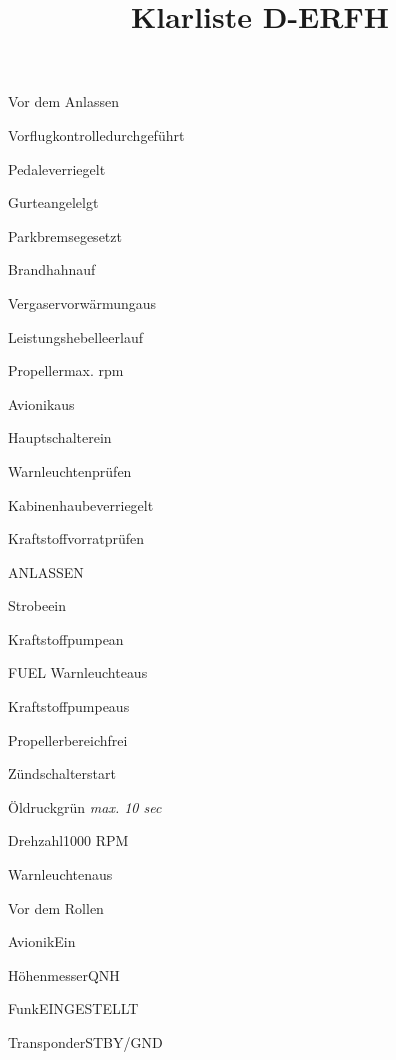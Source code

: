 \def\papersize{4}





\title{Klarliste D-ERFH}

\begin{task}
  \begin{checklist}{Vor dem Anlassen}
    \item{Vorflugkontrolle}{durchgeführt}
    \item{Pedale}{verriegelt}
    \item{Gurte}{angelelgt}
    \item{Parkbremse}{gesetzt}
    \item{Brandhahn}{auf}
    \item{Vergaservorwärmung}{aus}
    \item{Leistungshebel}{leerlauf}
    \item{Propeller}{max. rpm}
    \item{Avionik}{aus}
    \item{Hauptschalter}{ein}
    \item{Warnleuchten}{prüfen}
    \item{Kabinenhaube}{verriegelt}
    \item{Kraftstoffvorrat}{prüfen}
  \end{checklist}
\end{task}

\begin{task}
  \begin{checklist}{ANLASSEN}
    \item{Strobe}{ein}
    \item{Kraftstoffpumpe}{an}
    \item{FUEL Warnleuchte}{aus}
    \item{Kraftstoffpumpe}{aus}
    \item{Propellerbereich}{frei}
    \item{Zündschalter}{start}
    \item{Öldruck}{grün \textit{max. 10 sec}}
    \item{Drehzahl}{1000 RPM}
    \item{Warnleuchten}{aus}
  \end{checklist}
\end{task}

\begin{task}
  \begin{checklist}{Vor dem Rollen}
    \item{Avionik}{Ein}
    \item{Höhenmesser}{QNH}
    \item{Funk}{EINGESTELLT}
    \item{Transponder}{STBY/GND}
  \end{checklist}
\end{task}

